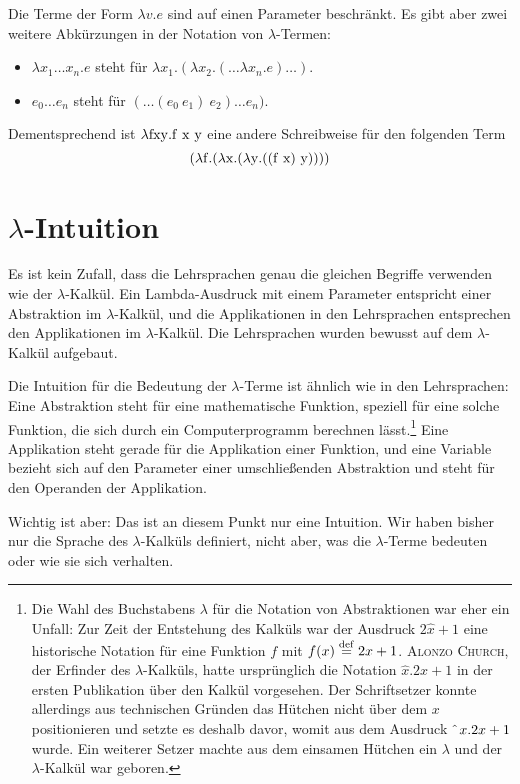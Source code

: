 Die Terme der Form $\lambda v.e$ sind auf einen Parameter
beschränkt.  Es gibt aber zwei weitere Abkürzungen
in der Notation von $\lambda$-Termen:
%
\begin{itemize}
\item $\lambda x_1 \ldots x_n.e$ steht für $\lambda x_1.(\lambda
  x_2.(\ldots\lambda x_n.e)\ldots)$.
\item $e_0 \ldots e_n$ steht für $(\ldots(e_0~e_1)~e_2) \ldots e_n)$.
\end{itemize}
%
Dementsprechend ist $\lambda \mathrm{fxy}.\mathrm f~\mathrm x~\mathrm y$ eine andere Schreibweise für
den folgenden Term \[(\lambda \mathrm f.(\lambda \mathrm x.(\lambda \mathrm y.((\mathrm f~\mathrm x)~\mathrm y))))\]

\section{$\lambda$-Intuition}

Es ist kein Zufall, dass die Lehrsprachen genau die gleichen Begriffe verwenden
wie der $\lambda$-Kalkül.  Ein Lambda-Ausdruck mit einem
Parameter entspricht einer Abstraktion im $\lambda$-Kalkül,
und die Applikationen in den Lehrsprachen entsprechen den Applikationen im
$\lambda$-Kalkül.  Die Lehrsprachen wurden bewusst auf dem
$\lambda$-Kalkül aufgebaut.

Die Intuition für die Bedeutung der $\lambda$-Terme ist ähnlich wie in
den Lehrsprachen: Eine Abstraktion steht für eine mathematische Funktion,
speziell für eine solche Funktion, die sich durch ein Computerprogramm
berechnen lässt.\footnote{Die Wahl des Buchstabens $\lambda$ für die
  Notation von Abstraktionen war eher ein Unfall: Zur Zeit der
  Entstehung des Kalküls war der Ausdruck $2\hat{x}+1$ eine historische Notation für eine
  Funktion $f$ mit $f(x)\stackrel{\rm def}{=}{}2x+1$.  \textsc{Alonzo Church},
  der Erfinder des $\lambda$-Kalküls, hatte ursprünglich
  die Notation $\hat{x}.2x+1$ in der ersten Publikation über den
  Kalkül vorgesehen.  Der Schriftsetzer konnte allerdings aus
  technischen Gründen
  das Hütchen nicht über dem $x$ positionieren und setzte es deshalb
  davor, womit aus dem Ausdruck $\hat{~}\thinspace{}x.2x+1$ wurde.  Ein weiterer
  Setzer machte aus dem einsamen Hütchen ein $\lambda$ und der
  $\lambda$-Kalkül war geboren.}  Eine Applikation steht gerade für
die Applikation einer Funktion, und eine Variable bezieht sich auf den
Parameter einer umschließenden Abstraktion und steht für den Operanden
der Applikation.  

Wichtig ist aber: Das ist an diesem Punkt nur eine Intuition.  Wir
haben bisher nur die Sprache des $\lambda$-Kalküls definiert, nicht
aber, was die $\lambda$-Terme bedeuten oder wie sie sich verhalten.

